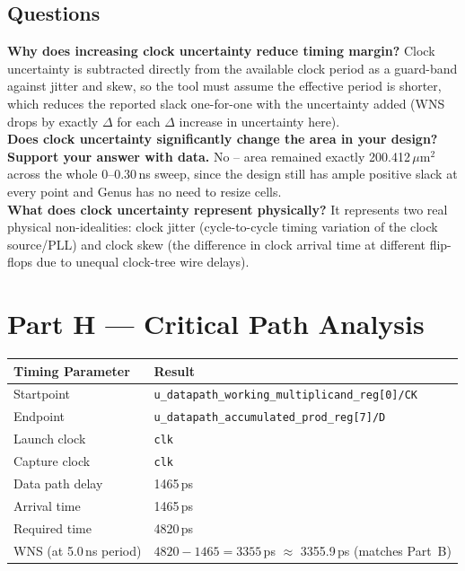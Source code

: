 \documentclass[11pt]{article}
\begin{document}
\subsection*{Questions}
\textbf{Why does increasing clock uncertainty reduce timing margin?} Clock uncertainty is subtracted
directly from the available clock period as a guard-band against jitter and skew, so the tool must
assume the effective period is shorter, which reduces the reported slack one-for-one with the
uncertainty added (WNS drops by exactly $\Delta$ for each $\Delta$ increase in uncertainty here).\\
\textbf{Does clock uncertainty significantly change the area in your design? Support your answer
with data.} No -- area remained exactly 200.412\,$\mu$m$^2$ across the whole 0--0.30\,ns sweep,
since the design still has ample positive slack at every point and Genus has no need to resize
cells.\\
\textbf{What does clock uncertainty represent physically?} It represents two real physical
non-idealities: clock jitter (cycle-to-cycle timing variation of the clock source/PLL) and clock
skew (the difference in clock arrival time at different flip-flops due to unequal clock-tree wire
delays).

\section{Part H --- Critical Path Analysis}
\begin{center}
\begin{tabular}{|l|l|}
\hline
\textbf{Timing Parameter} & \textbf{Result} \\ \hline
Startpoint & \texttt{u\_datapath\_working\_multiplicand\_reg[0]/CK} \\ \hline
Endpoint & \texttt{u\_datapath\_accumulated\_prod\_reg[7]/D} \\ \hline
Launch clock & \texttt{clk} \\ \hline
Capture clock & \texttt{clk} \\ \hline
Data path delay & 1465\,ps \\ \hline
Arrival time & 1465\,ps \\ \hline
Required time & 4820\,ps \\ \hline
WNS (at 5.0\,ns period) & $4820-1465=3355$\,ps $\approx$ 3355.9\,ps (matches Part~B) \\ \hline
\end{tabular}
\end{center}
\end{document}

